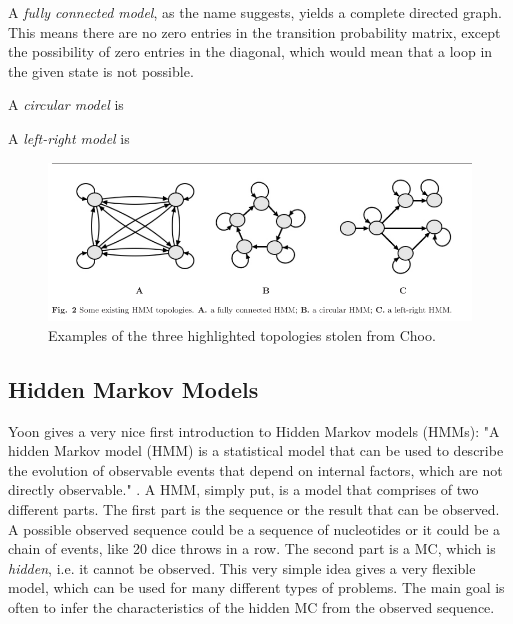 \documentclass{article}
\begin{document}
A \textit{fully connected model}, as the name suggests, yields a complete directed graph. This means there are no zero entries in the transition probability matrix, except the possibility of zero entries in the diagonal, which would mean that a loop in the given state is not possible. 

A \textit{circular model} is

A \textit{left-right model} is

\begin{figure}
    \centering
    \includegraphics[width = \textwidth]{ChooHMMTopologies.png}
    \caption{Examples of the three highlighted topologies stolen from Choo.}
    \label{fig:ChooTopologies}
\end{figure}

\subsection{Hidden Markov Models} \label{Section:HiddenMarkovModels}
Yoon gives a very nice first introduction to Hidden Markov models (HMMs): "A hidden Markov model (HMM) is a statistical model that can be used to describe the evolution of observable events that depend on internal factors, which are not directly observable." \cite{Yoon2009}. A HMM, simply put, is a model that comprises of two different parts. The first part is the sequence or the result that can be observed. A possible observed sequence could be a sequence of nucleotides or it could be a chain of events, like 20 dice throws in a row. The second part is a MC, which is \textit{hidden}, i.e. it cannot be observed. This very simple idea gives a very flexible model, which can be used for many different types of problems. The main goal is often to infer the characteristics of the hidden MC from the observed sequence. 
\end{document}
